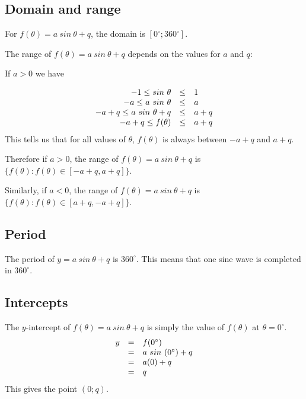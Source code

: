 \subsection*{Domain and range}
\nopagebreak
For $f(\theta )=a~sin~\theta +q$, the domain is $[0^{\circ}; 360^{\circ}]$. \par
The range of $f(\theta )=a~sin~\theta +q$ depends on the values for $a$ and $q$:\par 
If $a>0$ we have\par 
\nopagebreak\noindent{}
\begin{equation*}
\begin{array}{ccl}\hfill -1\le sin~\theta & \le & 1\hfill \\
 \hfill -a\le a~sin~\theta & \le & a\hfill \\
 \hfill -a+q\le a~sin~\theta +q& \le & a+q\hfill \\
 \hfill -a+q\le f(\theta )& \le & a+q\hfill 
\end{array}
\end{equation*}
This tells us that for all values of $\theta $, $f(\theta )$ is always between $-a+q$ and $a+q$. \par
Therefore if $a>0$, the range of $f(\theta )=a~sin~\theta +q$ is $\{f(\theta ):f(\theta )\in [-a+q,a+q]\}$.\par 
Similarly, if $a<0$, the range of $f(\theta )=a~sin~\theta +q$ is $\{f(\theta ):f(\theta )\in [a+q,-a+q]\}$.\par 


\subsection*{Period}
The period of $y=a~sin~\theta+q$ is $360^{\circ}$. This means that one sine wave is completed in $360^{\circ}$. 

\subsection*{Intercepts}
\nopagebreak
The $y$-intercept of $f(\theta )=a~sin~\theta+q$ is simply the value of $f(\theta )$ at $\theta =0^{\circ }$.
\begin{equation*}
\begin{array}{ccl}\hfill y& =& f(0^{\circ })\hfill \\
 & =& a~sin~(0^{\circ })+q\hfill \\
 & =& a(0)+q\hfill \\
 & =& q\hfill 
\end{array}
\end{equation*}
This gives the point $(0;q)$.

